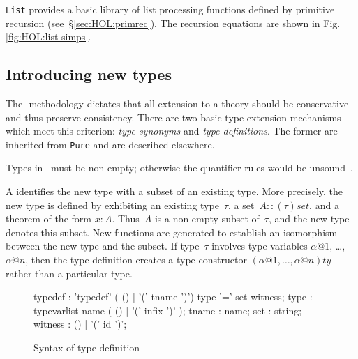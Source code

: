 {\tt List} provides a basic library of list processing functions defined by
primitive recursion (see~\S\ref{sec:HOL:primrec}). The recursion equations
are shown in Fig.\ts\ref{fig:HOL:list-simps}.


\subsection{Introducing new types}

The \HOL-methodology dictates that all extension to a theory should be
conservative and thus preserve consistency. There are two basic type
extension mechanisms which meet this criterion: {\em type synonyms\/} and
{\em type definitions\/}. The former are inherited from {\tt Pure} and are
described elsewhere.
\begin{warn}
  Types in \HOL\ must be non-empty; otherwise the quantifier rules would be
  unsound~\cite[\S7]{paulson-COLOG}.
\end{warn}
A  identifies the new type with a subset of an
existing type. More precisely, the new type is defined by exhibiting an
existing type~$\tau$, a set~$A::(\tau)set$, and a theorem of the form $x:A$.
Thus~$A$ is a non-empty subset of~$\tau$, and the new type denotes this
subset.  New functions are generated to establish an isomorphism between the
new type and the subset.  If type~$\tau$ involves type variables $\alpha@1$,
\ldots, $\alpha@n$, then the type definition creates a type constructor
$(\alpha@1,\ldots,\alpha@n)ty$ rather than a particular type.

\begin{figure}[htbp]
\begin{rail}
typedef  : 'typedef' ( () | '(' tname ')') type '=' set witness;
type    : typevarlist name ( () | '(' infix ')' );
tname   : name;
set     : string;
witness : () | '(' id ')';
\end{rail}
\caption{Syntax of type definition}
\label{fig:HOL:typedef}
\end{figure}

